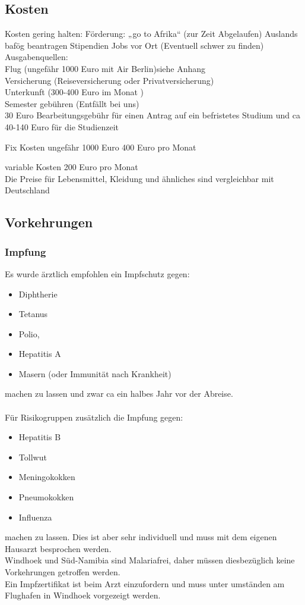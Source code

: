 \documentclass[11pt]{article}
\begin{document}
\subsection{Kosten}
Kosten gering halten:
Förderung: „go to Afrika“ (zur Zeit Abgelaufen)
Auslands bafög beantragen
Stipendien
Jobs vor Ort (Eventuell schwer zu finden)\\

Ausgabenquellen:\\
Flug (ungefähr 1000 Euro mit Air Berlin)siehe Anhang\\
Versicherung (Reiseversicherung oder Privatversicherung)\\
Unterkunft (300-400 Euro im Monat )\\
Semester gebühren (Entfällt bei uns)\\
30 Euro Bearbeitungsgebühr für einen Antrag auf ein befristetes Studium und ca 40-140 Euro für die Studienzeit

Fix Kosten 		ungefähr 1000 Euro
			400 Euro pro Monat

variable Kosten 	200 Euro pro Monat\\

Die Preise für Lebensmittel, Kleidung und ähnliches sind vergleichbar mit Deutschland

\subsection{Vorkehrungen}

\subsubsection{Impfung}
Es wurde ärztlich empfohlen ein Impfschutz gegen:
\begin{itemize}
\item Diphtherie
\item Tetanus
\item Polio,
\item Hepatitis A
\item Masern (oder Immunität nach Krankheit)
\end{itemize}
machen zu lassen und zwar ca ein halbes Jahr vor der 
Abreise. \\\\
Für Risikogruppen zusätzlich die Impfung gegen:
\begin{itemize}
\item Hepatitis B
\item Tollwut
\item Meningokokken
\item Pneumokokken
\item Influenza
\end{itemize}
 machen zu lassen. Dies ist aber sehr individuell und muss mit dem eigenen Hausarzt besprochen werden.
\\
Windhoek und Süd-Namibia sind Malariafrei, daher müssen diesbezüglich keine Vorkehrungen getroffen werden. 
\\
Ein Impfzertifikat ist beim Arzt einzufordern und muss unter umständen am Flughafen in Windhoek vorgezeigt werden.
\end{document}
